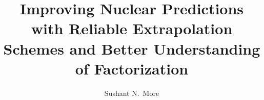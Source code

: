 \documentclass[11pt, phd]{osudissert96}
\title{
	\texorpdfstring{
		Improving Nuclear Predictions with Reliable Extrapolation Schemes and
		Better Understanding of Factorization
	}{
		Improving Nuclear Predictions with Reliable Extrapolation Schemes and
		Better Understanding of Factorization
	}
}
\author{Sushant N.\ More}
\begin{document}
\maketitle
\disscopyright
\clearpage


\dedication{To the memory of my late grandparents, who valued integrity and
 education above everything else.}




\tableofcontents

\clearpage
\listoffigures

\clearpage
\listoftables



\startdoublespace











\appendix
% 

\end{document}

